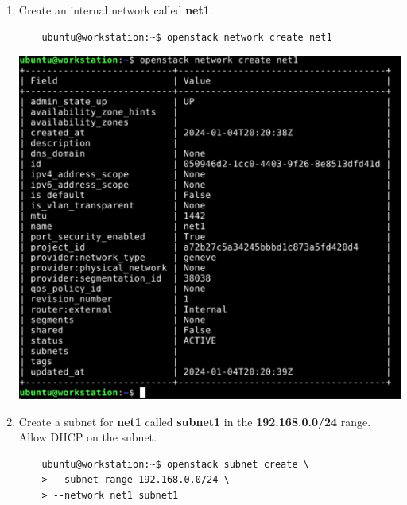 \documentclass[letterpaper, 12pt]{article}
\begin{document}
\begin{enumerate}
    \item Create an internal network called \textbf{net1}.
    \begin{lstlisting}
    ubuntu@workstation:~$ openstack network create net1
    \end{lstlisting}

    \begin{center}
        \includegraphics[width=\linewidth]{images/part1/step21.png}
    \end{center}

    \item Create a subnet for \textbf{net1} called \textbf{subnet1} in the \textbf{192.168.0.0/24} range. Allow DHCP on
    the subnet.
    \begin{lstlisting}
    ubuntu@workstation:~$ openstack subnet create \
    > --subnet-range 192.168.0.0/24 \
    > --network net1 subnet1
    \end{lstlisting}


\end{enumerate}
\end{document}
